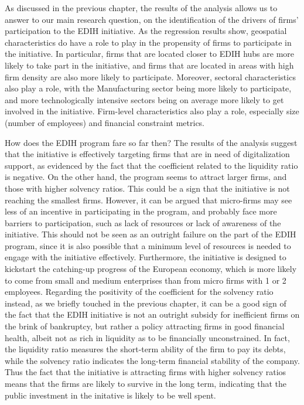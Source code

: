 \documentclass[12pt]{report}
\begin{document}
\par As discussed in the previous chapter, the results of the analysis allows us to answer to our main research question, on the identification of the drivers of firms' participation to the EDIH initiative. As the regression results show, geospatial characteristics do have a role to play in the propensity of firms to participate in the initiative. In particular, firms that are located closer to EDIH hubs are more likely to take part in the initiative, and firms that are located in areas with high firm density are also more likely to participate. Moreover, sectoral characteristics also play a role, with the Manufacturing sector being more likely to participate, and more technologically intensive sectors being on average more likely to get involved in the initiative. Firm-level characteristics also play a role, especially size (number of employees) and financial constraint metrics.
\par How does the EDIH program fare so far then? The results of the analysis suggest that the initiative is effectively targeting firms that are in need of digitalization support, as evidenced by the fact that the coefficient related to the liquidity ratio is negative. On the other hand, the program seems to attract larger firms, and those with higher solvency ratios. This could be a sign that the initiative is not reaching the smallest firms. However, it can be argued that micro-firms may see less of an incentive in participating in the program, and probably face more barriers to participation, such as lack of resources or lack of awareness of the initiative. This should not be seen as an outright failure on the part of the EDIH program, since it is also possible that a minimum level of resources is needed to engage with the initiative effectively. Furthermore, the initiative is designed to kickstart the catching-up progress of the European economy, which is more likely to come from small and medium enterprises than from micro firms with 1 or 2 employees. Regarding the positivity of the coefficient for the solvency ratio instead, as we briefly touched in the previous chapter, it can be a good sign of the fact that the EDIH initiative is not an outright subsidy for inefficient firms on the brink of bankruptcy, but rather a policy attracting firms in good financial health, albeit not as rich in liquidity as to be financially unconstrained. In fact, the liquidity ratio measures the short-term ability of the firm to pay its debts, while the solvency ratio indicates the long-term financial stability of the company. Thus the fact that the initiative is attracting firms with higher solvency ratios means that the firms are likely to survive in the long term, indicating that the public investment in the initative is likely to be well spent.
\end{document}
